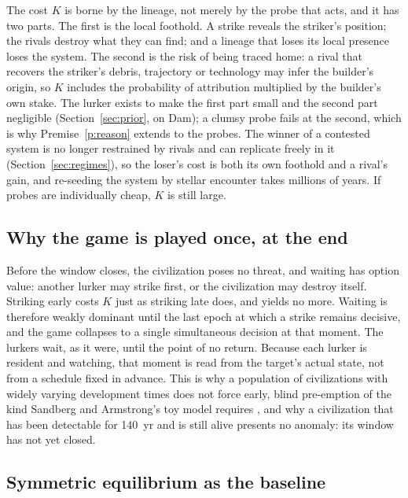 \documentclass[preprint,12pt]{elsarticle}
\theoremstyle{definition}
\begin{document}
The cost $K$ is borne by the lineage, not merely by the probe that acts, and it has two parts. The first is the local foothold. A strike reveals the striker's position; the rivals destroy what they can find; and a lineage that loses its local presence loses the system. The second is the risk of being traced home: a rival that recovers the striker's debris, trajectory or technology may infer the builder's origin, so $K$ includes the probability of attribution multiplied by the builder's own stake. The lurker exists to make the first part small and the second part negligible (Section~\ref{sec:prior}, on Dam); a clumsy probe fails at the second, which is why Premise~\ref{p:reason} extends to the probes. The winner of a contested system is no longer restrained by rivals and can replicate freely in it (Section~\ref{sec:regimes}), so the loser's cost is both its own foothold and a rival's gain, and re-seeding the system by stellar encounter takes millions of years. If probes are individually cheap, $K$ is still large.

\subsection{Why the game is played once, at the end}
\label{sec:lastmoment}

Before the window closes, the civilization poses no threat, and waiting has option value: another lurker may strike first, or the civilization may destroy itself. Striking early costs $K$ just as striking late does, and yields no more. Waiting is therefore weakly dominant until the last epoch at which a strike remains decisive, and the game collapses to a single simultaneous decision at that moment. The lurkers wait, as it were, until the point of no return. Because each lurker is resident and watching, that moment is read from the target's actual state, not from a schedule fixed in advance. This is why a population of civilizations with widely varying development times does not force early, blind pre-emption of the kind Sandberg and Armstrong's toy model requires \citep{SandbergArmstrong2013}, and why a civilization that has been detectable for 140~yr and is still alive presents no anomaly: its window has not yet closed.

\subsection{Symmetric equilibrium as the baseline}
\end{document}
